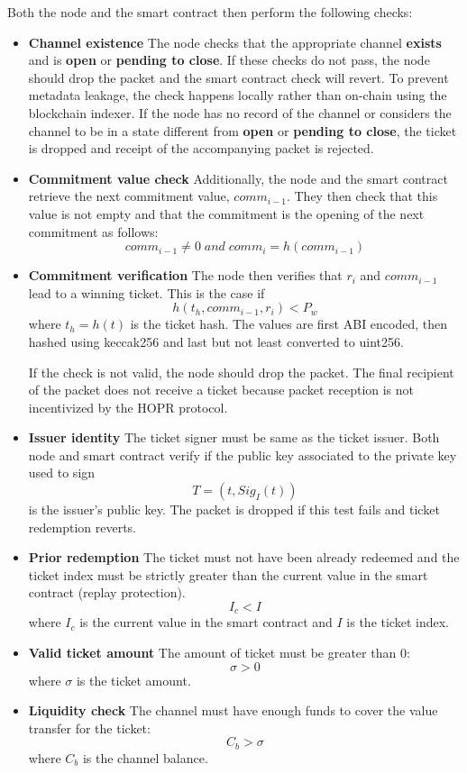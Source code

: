 Both the node and the smart contract then perform the following checks:

\begin{itemize}
    \item
          \textbf{Channel existence} The node checks that the appropriate channel \textbf{exists} and is \textbf{open} or \textbf{pending to close}. If these checks do not pass, the node should drop the packet and the smart contract check will revert. To prevent metadata leakage, the check happens locally rather than on-chain using the blockchain indexer. If the node has no record of the channel or considers the channel to be in a state different from \textbf{open} or \textbf{pending to close}, the ticket is dropped and receipt of the accompanying packet is rejected.
    \item
          \textbf{Commitment value check} Additionally, the node and the smart contract retrieve the next commitment value, $comm_{i-1}$. They then check that this value is not empty and that the commitment is the opening of the next commitment as follows: $$ comm_{i-1} \neq 0 \; and \; comm_{i}=h(comm_{i-1})$$
    \item
          \textbf{Commitment verification} The node then verifies that $r_i$ and $comm_{i-1}$ lead to a winning ticket. This is the case if $$h(t_h, comm_{i-1}, r_i) <P_w$$ where $t_h=h(t)$ is the ticket hash. The values are first ABI encoded, then hashed using keccak256 and last but not least converted to uint256.

          If the check is not valid, the node should drop the packet.
          The final recipient of the packet does not receive a ticket because packet reception is not incentivized by the HOPR protocol.
    \item
          \textbf{Issuer identity} The ticket signer must be same as the ticket issuer. Both node and smart contract verify if the public key associated to the private key used to sign $$T= (t, Sig_I(t))$$ is the issuer's public key. The packet is dropped if this test fails and ticket redemption reverts.
    \item
          \textbf{Prior redemption} The ticket must not have been already redeemed and the ticket index must be strictly greater than the current value in the smart contract (replay protection).
          $$I_c <I$$ where $I_c$ is the current value in the smart contract and $I$ is the ticket index.
    \item
          \textbf{Valid ticket amount} The amount of ticket must be greater than 0: $$\sigma>0$$ where $\sigma$ is the ticket amount.
    \item
          \textbf{Liquidity check} The channel must have enough funds to cover the value transfer for the ticket: $$ C_b>\sigma$$ where $C_b$ is the channel balance.
\end{itemize}

